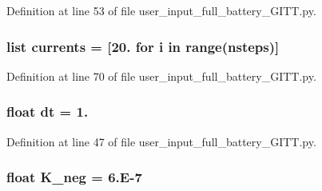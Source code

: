 Definition at line 53 of file user\-\_\-input\-\_\-full\-\_\-battery\-\_\-\-G\-I\-T\-T.\-py.

\hypertarget{namespaceuser__input__full__battery___g_i_t_t_a216022bdba987f127b6cc081ee78e2bd}{
\subsubsection[{currents}]{\setlength{\rightskip}{0pt plus 5cm}list currents = \mbox{[}20. for i in range({\bf nsteps})\mbox{]}}}\label{namespaceuser__input__full__battery___g_i_t_t_a216022bdba987f127b6cc081ee78e2bd}


Definition at line 70 of file user\-\_\-input\-\_\-full\-\_\-battery\-\_\-\-G\-I\-T\-T.\-py.

\hypertarget{namespaceuser__input__full__battery___g_i_t_t_a778e38aa889751afffa2dea6b803e67a}{
\subsubsection[{dt}]{\setlength{\rightskip}{0pt plus 5cm}float dt = 1.}}\label{namespaceuser__input__full__battery___g_i_t_t_a778e38aa889751afffa2dea6b803e67a}


Definition at line 47 of file user\-\_\-input\-\_\-full\-\_\-battery\-\_\-\-G\-I\-T\-T.\-py.

\hypertarget{namespaceuser__input__full__battery___g_i_t_t_a64d0c5854299798787675bc91586023c}{
\subsubsection[{K\-\_\-neg}]{\setlength{\rightskip}{0pt plus 5cm}float K\-\_\-neg = 6.\-E-\/7}}\label{namespaceuser__input__full__battery___g_i_t_t_a64d0c5854299798787675bc91586023c}


